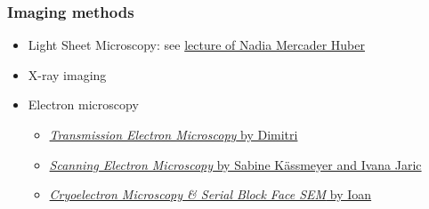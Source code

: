 \begin{frame}
	\frametitle{Imaging methods}
	\begin{itemize}
		\item Light Sheet Microscopy: see \href{https://ilias.unibe.ch/goto_ilias3_unibe_sess_2774501.html}{lecture of Nadia Mercader Huber }
		\item X-ray imaging
		\item Electron microscopy
		\begin{itemize}
			\item \href{https://ilias.unibe.ch/goto_ilias3_unibe_sess_2774501.html}{\emph{Transmission Electron Microscopy} by Dimitri}
			\item \href{https://ilias.unibe.ch/goto_ilias3_unibe_sess_2177954.html}{\emph{Scanning Electron Microscopy} by Sabine Kässmeyer and Ivana Jaric}
			\item \href{https://ilias.unibe.ch/goto_ilias3_unibe_sess_2774507.html}{\emph{Cryoelectron Microscopy \& Serial Block Face SEM} by Ioan}
		\end{itemize}
	\end{itemize}
\end{frame}

